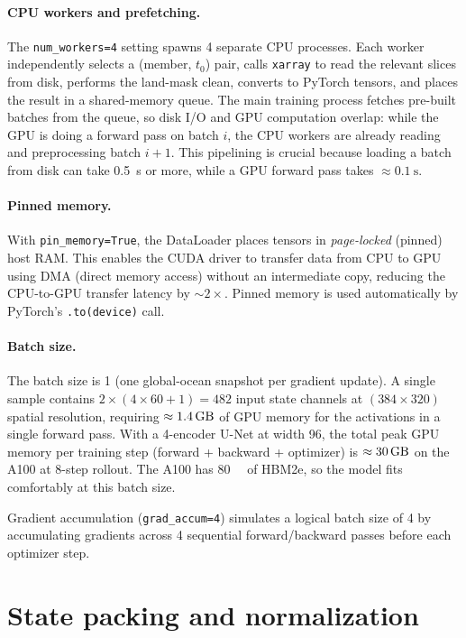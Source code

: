 \documentclass[11pt]{article}
\begin{document}
\paragraph{CPU workers and prefetching.}
The \texttt{num\_workers=4} setting spawns 4 separate CPU processes. Each
worker independently selects a (member, $t_0$) pair, calls \texttt{xarray}
to read the relevant slices from disk, performs the land-mask clean, converts
to PyTorch tensors, and places the result in a shared-memory queue. The main
training process fetches pre-built batches from the queue, so disk I/O and
GPU computation overlap: while the GPU is doing a forward pass on batch $i$,
the CPU workers are already reading and preprocessing batch $i+1$. This
pipelining is crucial because loading a batch from disk can take
\SI{0.5}{\second} or more, while a GPU forward pass takes
$\approx\SI{0.1}{\second}$.

\paragraph{Pinned memory.}
With \texttt{pin\_memory=True}, the DataLoader places tensors in
\emph{page-locked} (pinned) host RAM. This enables the CUDA driver to transfer
data from CPU to GPU using DMA (direct memory access) without an intermediate
copy, reducing the CPU-to-GPU transfer latency by $\sim2\times$. Pinned memory
is used automatically by PyTorch's \texttt{.to(device)} call.

\paragraph{Batch size.}
The batch size is 1 (one global-ocean snapshot per gradient update). A single
sample contains $2\times(4\times60+1)=482$ input state channels at
$(384\times320)$ spatial resolution, requiring $\approx\SI{1.4}{\giga\byte}$
of GPU memory for the activations in a single forward pass. With a 4-encoder
U-Net at width 96, the total peak GPU memory per training step (forward +
backward + optimizer) is $\approx\SI{30}{\giga\byte}$ on the A100 at 8-step
rollout. The A100 has \SI{80}{\giga\byte} of HBM2e, so the model fits
comfortably at this batch size.

Gradient accumulation (\texttt{grad\_accum=4}) simulates a logical batch size
of 4 by accumulating gradients across 4 sequential forward/backward passes
before each optimizer step.

\section{State packing and normalization}
\label{sec:norm}
\end{document}
